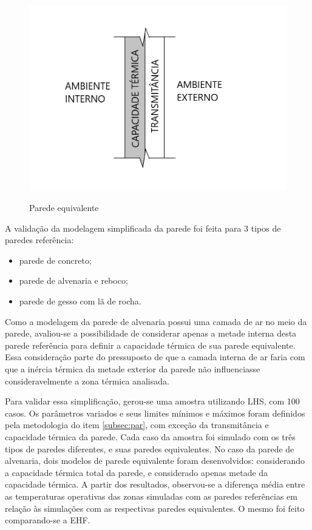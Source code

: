 \documentclass[brazil,hardcopy,openany,a5paper]{ufscthesis}
\begin{document}
		\begin{figure}[h]
			\centering
			\caption{Parede equivalente}
			\includegraphics[width=1\linewidth]{img/parede_eq.png}
			\label{fig:parede_eq}
		\end{figure}
	
		A validação da modelagem simplificada da parede foi feita para 3 tipos de paredes referência:
		
		\begin{itemize}
			\item parede de concreto;
			\item parede de alvenaria e reboco;
			\item parede de gesso com lã de rocha.
		\end{itemize}
		
		Como a modelagem da parede de alvenaria possui uma camada de ar no meio da parede, avaliou-se a possibilidade de considerar apenas a metade interna desta parede referência para definir a capacidade térmica de sua parede equivalente. Essa consideração parte do pressuposto de que a camada interna de ar faria com que a inércia térmica da metade exterior da parede não influenciasse consideravelmente a zona térmica analisada.
		
		Para validar essa simplificação, gerou-se uma amostra utilizando LHS, com 100 casos.
		Os parâmetros variados e seus limites mínimos e máximos foram definidos pela metodologia do item \ref{subsec:par}, com exceção da transmitância e capacidade térmica da parede.  %
		Cada caso da amostra foi simulado com os três tipos de paredes diferentes, e suas paredes equivalentes. No caso da parede de alvenaria, dois modelos de parede equivalente foram desenvolvidos: considerando a capacidade térmica total da parede, e considerado apenas metade da capacidade térmica.
		A partir dos resultados, observou-se a diferença média entre as temperaturas operativas das zonas simuladas com as paredes referências em relação às simulações com as respectivas paredes equivalentes. O mesmo foi feito comparando-se a EHF.
		
\end{document}
